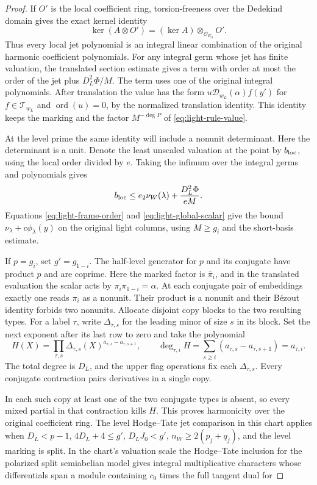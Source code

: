 \begin{proof}
If \(O'\) is the local
coefficient ring, torsion-freeness over the Dedekind domain
gives the exact kernel identity
\[
 \ker(A\otimes O')=(\ker A)\otimes_{\mathcal O_{K_0}}O' .
\]
Thus every local jet polynomial is an integral linear
combination of the original harmonic coefficient polynomials.
For any integral
germ whose jet has finite valuation, the translated section estimate
gives a term with order at most the order of the jet plus
\(D_L^2\Phi/M\). The term uses one of the original integral
polynomials. After translation the value has the form
\(u\mathcal D_{w_L}(\alpha)f(y')\) for \(f\in\mathcal T_{w_L}\)
and \(\operatorname{ord}(u)=0\), by the normalized translation
identity. This identity keeps the marking and the factor
\(M^{-\deg P}\) of \eqref{eq:light-rule-value}.

At the level
prime the same identity will include a nonunit determinant.
Here the determinant is a unit. Denote the least unscaled valuation at the point by \(b_{\rm loc}\), using the local order divided by \(e\). Taking the infimum over the integral germs and polynomials gives
\[
  b_{\rm loc}\le e_2\nu_W(\lambda)+\frac{D_L^2\Phi}{eM}.
\]
Equations \eqref{eq:light-frame-order} and
\eqref{eq:light-global-scalar} give the bound
\(\nu_\lambda+c\phi_\lambda(y)\) on the original light columns,
using \(M\ge g_i\) and the short-basis estimate.
\label{cor:slice-finite-depth-4}

If \(p=g_i\), set \(g'=g_{1-i}\).
The half-level generator for \(p\) and its conjugate have
product \(p\) and are coprime. Here the marked factor is
\(\bar\pi_i\), and in the translated evaluation the scalar acts by \(\pi_i\pi_{1-i}=\alpha\). At each conjugate pair
of embeddings exactly one reads \(\pi_i\) as a nonunit.
Their product is a nonunit and their B\'ezout identity
forbids two nonunits. Allocate disjoint copy blocks to the two resulting types.
For a label \(\tau\), write \(\Delta_{\tau,s}\) for the leading
minor of size \(s\) in its block. Set the next exponent after its
last row to zero and take the polynomial
\[
 H(X)=\prod_{\tau,s}\Delta_{\tau,s}(X)^{a_{\tau,s}-a_{\tau,s+1}},
 \qquad
 \deg_{\tau,i}H=\sum_{s\ge i}(a_{\tau,s}-a_{\tau,s+1})
                    =a_{\tau,i}.
\]
The total degree is \(D_L\), and the upper flag operations fix
each \(\Delta_{\tau,s}\). Every conjugate contraction pairs
derivatives in a single copy.

In each such copy at least one
of the two conjugate types is absent, so every mixed partial
in that contraction kills \(H\). This proves harmonicity over
the original coefficient ring.
The level Hodge--Tate jet comparison in this chart
applies when \(D_L<p-1\), \(4D_L+4\le g'\),
\(D_LJ_0<g'\), \(n_W\ge2(p_j+q_j)\), and the
level marking is split. In the chart's valuation scale the Hodge--Tate
inclusion for the polarized split semiabelian model gives integral
multiplicative characters whose differentials span a module
containing \(c_0\) times the full tangent dual for


\end{proof}

